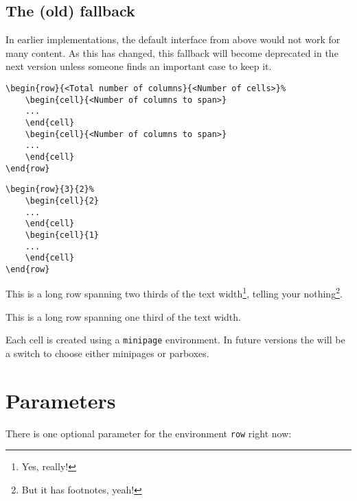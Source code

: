 \documentclass[DIV13]{scrartcl}
\begin{document}
\clearpage

\subsection{The (old) fallback}
In earlier implementations, the default interface from above would not work for many content. As this has changed, this fallback will become deprecated in the next version unless someone finds an important case to keep it.

\begin{lstlisting}
\begin{row}{<Total number of columns}{<Number of cells>}%
	\begin{cell}{<Number of columns to span>}
	...
	\end{cell}
	\begin{cell}{<Number of columns to span>}
	...
	\end{cell}
\end{row}
\end{lstlisting}

\begin{lstlisting}
\begin{row}{3}{2}%
	\begin{cell}{2}
	...
	\end{cell}
	\begin{cell}{1}
	...
	\end{cell}
\end{row}
\end{lstlisting}

\begin{row}{3}{2}%
	\begin{cell}{2}
	This is a long row spanning two thirds of the text width\footnote{Yes, really!}, telling your nothing\footnote{But it has footnotes, yeah!}.
	\end{cell}
	\begin{cell}{1}
	This is a long row spanning one third of the text width.
	\end{cell}
\end{row}

\bigskip

Each cell is created using a \texttt{minipage} environment. In future versions the will be a switch to choose either minipages or parboxes.

\section{Parameters}
There is one optional parameter for the environment \texttt{row} right now:
\end{document}
